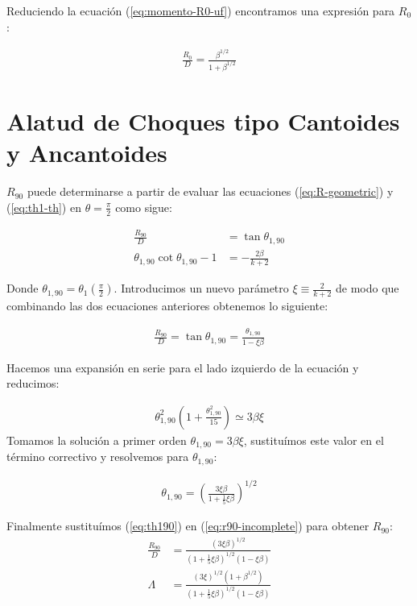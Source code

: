 Reduciendo la ecuación (\ref{eq:momento-R0-uf}) encontramos una expresión para $R_0$:

\begin{align}
  \frac{R_0}{D} = \frac{\beta^{1/2}}{1+\beta^{1/2}}
\end{align}

\section[Alatud]{Alatud de Choques tipo Cantoides y Ancantoides}
$R_{90}$ puede determinarse a partir de evaluar las ecuaciones (\ref{eq:R-geometric}) y (\ref{eq:th1-th}) en $\theta=\frac{\pi}{2}$
como sigue:

\begin{align}
  \frac{R_{90}}{D} &= \tan\theta_{1,90} \\
  \theta_{1,90}\cot\theta_{1,90} -1 &=  - \frac{2\beta}{k+2}
\end{align}

Donde $\theta_{1,90} = \theta_1\left(\frac{\pi}{2}\right)$. Introducimos un nuevo parámetro $\xi \equiv \frac{2}{k+2}$ de modo que
combinando las dos ecuaciones anteriores obtenemos lo siguiente:

\begin{align}
  \frac{R_{90}}{D} = \tan\theta_{1,90} = \frac{\theta_{1,90}}{1-\xi\beta} \label{eq:r90-incomplete}
\end{align}

Hacemos una expansión en serie para el lado izquierdo de la ecuación y reducimos:

\begin{align}
  \theta^2_{1,90}\left(1 + \frac{\theta^2_{1,90}}{15}\right) \simeq 3\beta\xi
\end{align}
Tomamos la solución a primer orden $\theta_{1,90} = 3\beta\xi$,  sustituímos este valor en el término correctivo y resolvemos para
$\theta_{1,90}$:

\begin{align}
  \theta_{1,90} = \left(\frac{3\xi\beta}{1+\frac{1}{5}\xi\beta}\right)^{1/2} \label{eq:th190}
\end{align}

Finalmente sustituímos (\ref{eq:th190}) en (\ref{eq:r90-incomplete}) para obtener $R_{90}$:
\begin{align}
  \frac{R_{90}}{D} &= \frac{\left(3\xi\beta\right)^{1/2}}{\left(1+\frac{1}{5}\xi\beta\right)^{1/2}\left(1-\xi\beta\right)} \\
  \Lambda &= \frac{\left(3\xi\right)^{1/2}\left(1+\beta^{1/2}\right)}
                   {\left(1+\frac{1}{5}\xi\beta\right)^{1/2}\left(1-\xi\beta\right)} 
\end{align}

